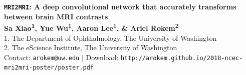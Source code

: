 \documentclass[a0, landscape]{a0poster}
\begin{document}


\begin{minipage}[b]{0.9\linewidth}
\veryHuge \color{NavyBlue} \textbf{{\tt MRI2MRI}: A deep convolutional network that accurately transforms between brain MRI contrasts} \color{Black}\\ %
\huge \textbf{Sa Xiao\textsuperscript{1}, Yue Wu\textsuperscript{1}, Aaron Lee\textsuperscript{1}, \& Ariel Rokem\textsuperscript{2}}\\ %
\Large 1. The Department of Ophthalmology, The University of Washington \\ 2. The eScience Institute, The University of Washington \\%
\Large Contact: \texttt{arokem@uw.edu} $|$ Download: \texttt{http://arokem.github.io/2018-ncec-mri2mri-poster/poster.pdf}
\end{minipage}
%
%
\end{document}
